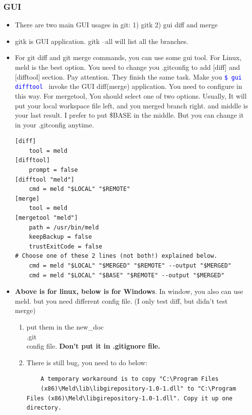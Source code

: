 \documentclass[a4paper,12pt,twoside]{book}
\newcommand{\linuxcommand}[1]{\texttt{\textcolor{blue}{\$ #1 \Pisymbol{psy}{191}}}}
\begin{document}
\subsubsection{GUI}
\begin{itemize}
	\item There are two main GUI usages in git: 1) gitk 2) gui diff and merge    

    \item gitk is GUI application. gitk --all will list all the branches.

    \item For git diff and git merge commands, you can use some gui tool. For Linux, meld is the best option. You need to change you .gitconfig to add [diff] and [difftool] section. Pay attention. They finish the same task. Make you \linuxcommand{gui difftool} invoke the GUI diff(merge) application. You need to configure in this way. For mergetool, You should select one of two options. Usually, It will put your local workspace file left, and you merged branch right. and middle is your last result. I prefer to put \$BASE in the middle. But you can change it in your .gitconfig anytime. 
\begin{verbatim}
[diff]
    tool = meld
[difftool]
	prompt = false
[difftool "meld"]
	cmd = meld "$LOCAL" "$REMOTE"
[merge]
    tool = meld
[mergetool "meld"]
	path = /usr/bin/meld
	keepBackup = false
	trustExitCode = false	
# Choose one of these 2 lines (not both!) explained below.
	cmd = meld "$LOCAL" "$MERGED" "$REMOTE" --output "$MERGED"
    cmd = meld "$LOCAL" "$BASE" "$REMOTE" --output "$MERGED"
\end{verbatim}

\item \textbf{Above is for linux, below is for Windows}. In window, you also can use meld. but you need different config file. (I only test diff, but didn't test merge)
\begin{enumerate}
	\item put them in the new\_doc\\.git\\config file. \textbf{Don't put it in .gitignore file.}
	\item There is still bug, you need to do below:
	\begin{verbatim}       
	A temporary workaround is to copy "C:\Program Files
	(x86)\Meld\lib\libgirepository-1.0-1.dll" to "C:\Program Files (x86)\Meld\libgirepository-1.0-1.dll". Copy it up one directory.
\end{verbatim}


\end{enumerate}
\end{itemize}
\end{document}
